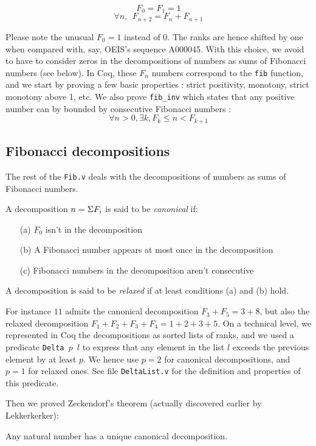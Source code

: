 \documentclass[a4paper,11pt]{article}
\begin{document}
$$F_0 = F_1 = 1$$
$$\forall n,~~ F_{n+2} = F_{n}+F_{n+1}$$

Please note the unusual $F_0 = 1$ instead of $0$. The ranks are hence
shifted by one when compared with, say, OEIS's sequence A000045.
With this choice, we avoid to have to consider zeros in the
decompositions of numbers as sums of Fibonacci numbers (see
below). In Coq, these $F_n$ numbers correspond to the {\tt fib}
function, and we start by proving a few basic properties :
strict positivity, monotony, strict monotony above 1, etc.
We also prove {\tt fib\_inv} which states 
that any positive number can by bounded by
consecutive Fibonacci numbers :
$$\forall n>0, \exists k, F_k \le n < F_{k+1}$$

\subsection{Fibonacci decompositions} The rest of the {\tt Fib.v}
deals with the decompositions of numbers as sums of Fibonacci
numbers.
\begin{definition}
 A decomposition $n = \Sigma F_i$ is said to be \emph{canonical} if:
\begin{itemize}
\item[(a)] $F_0$ isn't in the decomposition
\item[(b)] A Fibonacci number appears at most once in the decomposition
\item[(c)] Fibonacci numbers in the decomposition aren't consecutive
\end{itemize}
A decomposition is said to be \emph{relaxed} if at least conditions
(a) and (b) hold. 
\end{definition}
For instance $11$ admits the canonical decomposition
$F_3+F_5 = 3 + 8$, but also the relaxed decomposition $F_1+F_2+F_3+F_4
= 1 + 2 + 3 + 5$.
On a technical level, we represented in Coq the decompositions
as sorted lists of ranks, and we used a predicate {\tt Delta $p$ $l$}
to express that any element in the list $l$ exceeds the previous
element by at least $p$. We hence use $p=2$ for canonical
decompositions, and $p=1$ for relaxed ones. See file
{\tt DeltaList.v} for the definition and properties of this
predicate.

Then we proved Zeckendorf's theorem (actually discovered earlier by Lekkerkerker):

\begin{theorem}[Zeckendorf]
Any natural number has a unique canonical decomposition.
\end{theorem}
\end{document}
